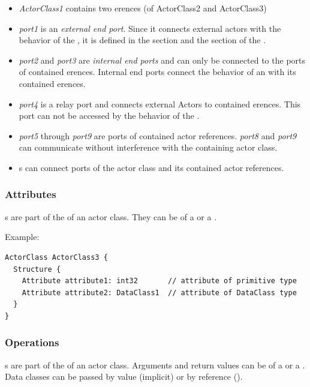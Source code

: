 \begin{itemize}
\item \textit{ActorClass1} contains two erences (of ActorClass2 and ActorClass3)
\item \textit{port1} is an \textit{external end port}. Since it connects external actors with the behavior 
of the , it is defined in the  section and the  section of 
the .
\item \textit{port2} and \textit{port3} are \textit{internal end ports} and can only be connected to the 
ports of contained erences. Internal end ports connect the behavior of an  with its 
contained erences.
\item \textit{port4} is a relay port and connects external Actors to contained erences. This port 
can not be accessed by the behavior of the .
\item \textit{port5} through \textit{port9} are ports of contained actor references. \textit{port8} and 
\textit{port9} can communicate without interference with the containing actor class.
\item {}s can connect ports of the actor class and its contained actor references. 
\end{itemize}

\subsubsection*{Attributes}

s are part of the  of an actor class.
They can be of a  or a .

Example:

\begin{lstlisting}
ActorClass ActorClass3 {
  Structure {
    Attribute attribute1: int32       // attribute of primitive type
    Attribute attribute2: DataClass1  // attribute of DataClass type
  }
}
\end{lstlisting}

\subsubsection*{Operations}

s are part of the  of an actor class.  Arguments and return values can be of a 
 or a . Data classes can be passed by value (implicit) or by reference ().

